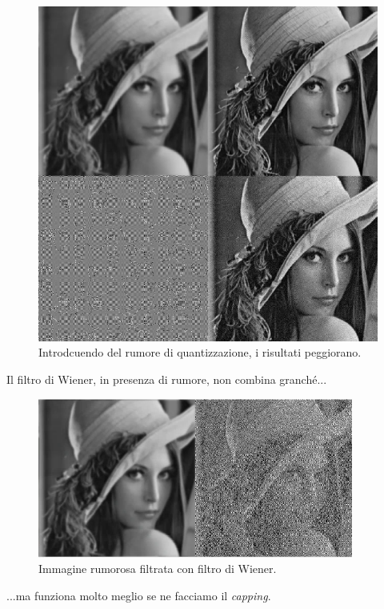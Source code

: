 \documentclass[a4paper,11pt]{article}
\begin{document}
\renewcommand{\thefigure}{8.13}
\begin{figure}[!h]
  \centering
    \includegraphics[scale=0.5]{images/8/lena_inversion_with_quantization.png}
    \caption{Introdcuendo del rumore di quantizzazione, i risultati peggiorano.}
\end{figure}

Il filtro di Wiener, in presenza di rumore, non combina granché...

\renewcommand{\thefigure}{8.14}
\begin{figure}[!h]
  \centering
    \includegraphics[scale=0.5]{images/8/lena_wiener.png}
    \caption{Immagine rumorosa filtrata con filtro di Wiener.}
\end{figure}

...ma funziona molto meglio se ne facciamo il \textit{capping}.
\end{document}
